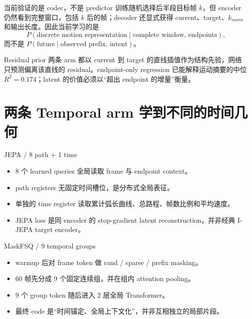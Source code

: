 \documentclass[10pt,a4paper,fontset=none]{ctexart}
\begin{document}
\begin{darkbox}{当前验证的是 codec，不是 predictor}
训练随机选择后半段目标帧 $k$，但 encoder 仍然看到完整窗口，包括 $k$ 后的帧；decoder 还显式获得 current、target、$k_{norm}$ 和输出长度。因此当前学习的是
\[
P(\text{discrete motion representation}\mid\text{complete window, endpoints}),
\]
而不是 $P(\text{future}\mid\text{observed prefix, intent})$。
\end{darkbox}

\begin{boundarybox}{Residual prior}
两条 arm 都以 current 到 target 的直线插值作为结构先验，网络只预测偏离该直线的 residual。endpoint-only regression 已能解释运动摘要的中位 $R^2=0.174$；latent 的价值必须以“超出 endpoint 的增量”衡量。
\end{boundarybox}

\section{两条 Temporal arm 学到不同的时间几何}

\begin{minipage}[t]{0.49\linewidth}
\begin{insightbox}{JEPA / 8 path + 1 time}
\begin{itemize}
  \item 8 个 learned queries 全局读取 frame 与 endpoint context。
  \item path registers 无固定时间槽位，是分布式全局表征。
  \item 单独的 time register 读取累计弧长曲线、总路程、帧数比例和平均速度。
  \item JEPA loss 是同 encoder 的 stop-gradient latent reconstruction，并非经典 I-JEPA target encoder。
\end{itemize}
\end{insightbox}
\end{minipage}\hfill
\begin{minipage}[t]{0.49\linewidth}
\begin{insightbox}{MaskFSQ / 9 temporal groups}
\begin{itemize}
  \item warmup 后对 frame token 做 rand / sparse / prefix masking。
  \item 60 帧先分成 9 个固定连续组，并在组内 attention pooling。
  \item 9 个 group token 随后进入 2 层全局 Transformer。
  \item 最终 code 是“时间锚定、全局上下文化”，并非互相独立的局部片段。
\end{itemize}
\end{insightbox}
\end{minipage}
\end{document}
